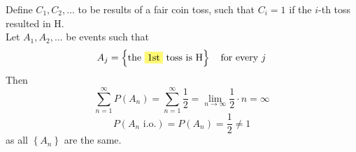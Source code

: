 \begin{example}
    Define $C_1, C_2, \dots$ to be results of a fair coin toss, such that $C_i = 1$ if the $i$-th toss resulted in H.
    \\Let $A_1, A_2, \dots$ be events such that
    \[A_j = \left\{\text{the \hlt{1st} toss is H}\right\} \quad \text{for every } j\]
    Then
    \[\sum_{n=1}^\infty P(A_n) = \sum_{n=1}^\infty \frac{1}{2} = \lim_{n\to\infty}\frac{1}{2}\cdot n = \infty\]
    \[P(A_n \text{ i.o.}) = P(A_n) = \frac{1}{2} \neq 1\]
    as all $\left\{A_n\right\}$ are the same.
\end{example}
